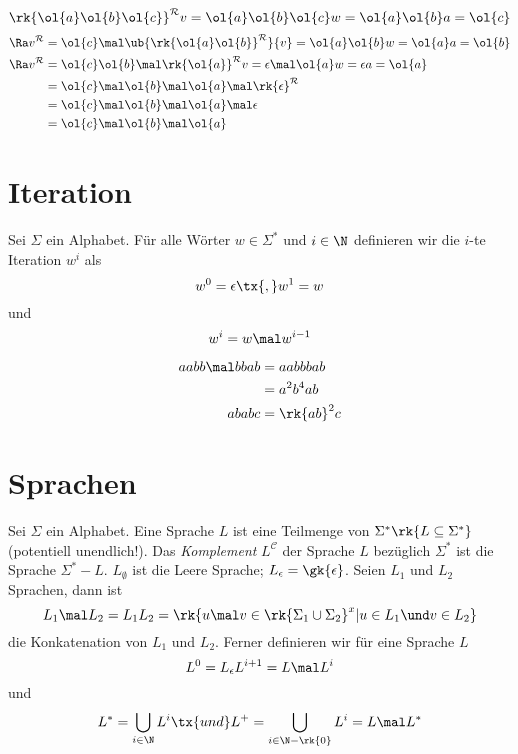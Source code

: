 \begin{example}
$\rk{\ol{a} \ol{b} \ol{c}}^{\mathcal{R}} v = \ol{a} \ol{b} \ol{c} w = \ol{a} \ol{b} a = \ol{c}$
\begin{align*}
\Ra v^{\mathcal{R}} &= \ol{c} \mal \ub{\rk{\ol{a} \ol{b}}^\mathcal{R}}{v} = \ol{a} \ol{b} w = \ol{a} a = \ol{b}\\
\Ra v^{\mathcal{R}} &= \ol{c} \ol{b} \mal \rk{\ol{a}}^{\mathcal{R}} v = \epsilon \mal \ol{a} w = \epsilon a = \ol{a}\\
&= \ol{c} \mal \ol{b} \mal \ol{a} \mal \rk{\epsilon}^{\mathcal{R}}\\
&= \ol{c} \mal \ol{b} \mal \ol{a} \mal \epsilon\\
&= \ol{c} \mal \ol{b} \mal \ol{a}
\end{align*}
\end{example}

\section{Iteration}
\begin{definition}[Iteration]
Sei $\Sigma$ ein Alphabet. Für alle Wörter $w \in \Sigma^*$ und $i \in \N$ definieren wir die $i$-te Iteration $w^i$ als
\[w^0 = \epsilon \tx{, } w^1 = w\]
und
\[w^i = w \mal w^{i - 1}\]
\label{def:Iteration}
\end{definition}

\begin{example}
\begin{align*}
aabb \mal bbab &= aabbbab\\
&= a^2 b^4 ab\\
ababc &= \rk{ab}^2 c
\end{align*}
\end{example}

\section{Sprachen}
\begin{definition}
Sei $\Sigma$ ein Alphabet. Eine Sprache $L$ ist eine Teilmenge von $\Sigma^* \rk{L \subseteq \Sigma^*}$ (potentiell unendlich!). Das \emph{Komplement} $L^{\mathcal{C}}$ der Sprache $L$ bezüglich $\Sigma^*$ ist die Sprache $\Sigma^* - L$. $L_{\emptyset}$ ist die Leere Sprache; $L_{\epsilon} = \gk{\epsilon}$. Seien $L_1$ und $L_2$ Sprachen, dann ist
\[L_1 \mal L_2 = L_1 L_2 = \rk{u \mal v \in \rk{\Sigma_1 \cup \Sigma_2}^x \vert u \in L_1 \und v \in L_2}\]
die Konkatenation von $L_1$ und $L_2$. Ferner definieren wir für eine Sprache $L$
\[L^0 = L_{\epsilon} L^{i + 1} = L \mal L^i\]
und
\[L^* = \bigcup_{i \in \N} L^i \tx{ und } L^+ = \bigcup_{i \in \N - \rk{0}} L^i = L \mal L^*\]
\label{def:Sprache_Konkatenation_von_Sprachen_Kleene-Stern}
\end{definition}

